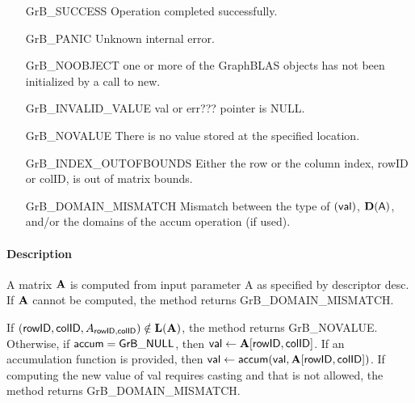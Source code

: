 \begin{itemize}[leftmargin=2.1in]
\item[{\sf GrB\_SUCCESS}]             Operation completed successfully.
\item[{\sf GrB\_PANIC}]               Unknown internal error.
\item[{\sf GrB\_NOOBJECT}]   one or more of the GraphBLAS objects has
                             not been initialized by a call to {\sf new}.
\item[{\sf GrB\_INVALID\_VALUE}]    {\sf val} or {\sf err???} pointer is {\sf NULL}.
\item[{\sf GrB\_NOVALUE}]             There is no value stored at the specified location.
\item[{\sf GrB\_INDEX\_OUTOFBOUNDS}]  Either the row or the column index,
                                      {\sf rowID} or {\sf colID}, is out of matrix bounds.
\item[{\sf GrB\_DOMAIN\_MISMATCH}]    Mismatch between the type of $(\sf val)$, 
                                      $\bold{D}({\sf A})$, and/or the domains of the 
                                      {\sf accum} operation (if used).
\end{itemize}

\paragraph{Description}

A matrix ${\bf A}$ is computed from input parameter {\sf A} as specified by descriptor {\sf desc}.
If ${\bf A}$ cannot be computed, the method returns {\sf GrB\_DOMAIN\_MISMATCH}.

If $({\sf rowID},{\sf colID}, A_{{\sf rowID},{\sf colID}}) \notin \bold{L}({\bf A})$, 
the method returns {\sf GrB\_NOVALUE}.  Otherwise, if 
${\sf accum} = {\sf GrB\_NULL}$, then ${\sf val} \leftarrow {\bf A}[{\sf rowID},{\sf colID}]$.
If an accumulation function is provided, then 
${\sf val} \leftarrow {\sf accum}({\sf val},{\bf A}[{\sf rowID},{\sf colID}])$.
If computing the new value of {\sf val} requires casting and that is not allowed,
the method returns {\sf GrB\_DOMAIN\_MISMATCH}.
